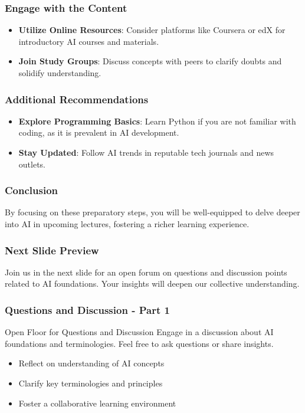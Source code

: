 \documentclass[aspectratio=169]{beamer}
\begin{document}
\begin{frame}[fragile]
    \frametitle{Engage with the Content}
    \begin{itemize}
        \item \textbf{Utilize Online Resources}: Consider platforms like Coursera or edX for introductory AI courses and materials.
        \item \textbf{Join Study Groups}: Discuss concepts with peers to clarify doubts and solidify understanding.
    \end{itemize}
\end{frame}

\begin{frame}[fragile]
    \frametitle{Additional Recommendations}
    \begin{itemize}
        \item \textbf{Explore Programming Basics}: Learn Python if you are not familiar with coding, as it is prevalent in AI development.
        \item \textbf{Stay Updated}: Follow AI trends in reputable tech journals and news outlets.
    \end{itemize}
\end{frame}

\begin{frame}[fragile]
    \frametitle{Conclusion}
    By focusing on these preparatory steps, you will be well-equipped to delve deeper into AI in upcoming lectures, fostering a richer learning experience.
\end{frame}

\begin{frame}[fragile]
    \frametitle{Next Slide Preview}
    Join us in the next slide for an open forum on questions and discussion points related to AI foundations. Your insights will deepen our collective understanding.
\end{frame}

\begin{frame}[fragile]
    \frametitle{Questions and Discussion - Part 1}
    \begin{block}{Open Floor for Questions and Discussion}
        Engage in a discussion about AI foundations and terminologies. Feel free to ask questions or share insights.
    \end{block}
    
    \begin{itemize}
        \item Reflect on understanding of AI concepts
        \item Clarify key terminologies and principles
        \item Foster a collaborative learning environment
    \end{itemize}
\end{frame}
\end{document}
